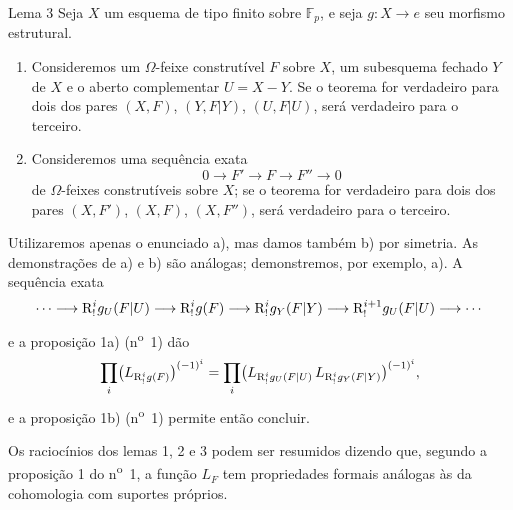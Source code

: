 \begin{statement}{Lema 3}
Seja $X$ um esquema de tipo finito sobre $\mathbb F_p$, e seja $g:X\to e$ seu morfismo estrutural.
\begin{enumerate}[label=\alph*)]
\item Consideremos um $\Omega$-feixe construtível $F$ sobre $X$, um subesquema fechado $Y$ de $X$ e o aberto complementar $U=X-Y$. Se o teorema for verdadeiro para dois dos pares $(X,F)$, $(Y,F|Y)$, $(U,F|U)$, será verdadeiro para o terceiro.
\item Consideremos uma sequência exata
\[
0\longrightarrow F'\longrightarrow F\longrightarrow F''\longrightarrow0
\]
de $\Omega$-feixes construtíveis sobre $X$; se o teorema for verdadeiro para dois dos pares $(X,F')$, $(X,F)$, $(X,F'')$, será verdadeiro para o terceiro.
\end{enumerate}
\end{statement}

Utilizaremos apenas o enunciado a), mas damos também b) por simetria. As demonstrações de a) e b) são análogas; demonstremos, por exemplo, a). A sequência exata
\[
\cdots\longrightarrow \mathrm{R}^i_!g_U(F|U)\longrightarrow \mathrm{R}^i_!g(F)
\longrightarrow \mathrm{R}^i_!g_Y(F|Y)\longrightarrow \mathrm{R}^{i+1}_!g_U(F|U)\longrightarrow\cdots
\]
e a proposição 1a) (n\textsuperscript{o}~1) dão
\[
\prod_i\bigl(L_{\mathrm{R}^i_!g(F)}\bigr)^{(-1)^i}
=\prod_i\bigl(L_{\mathrm{R}^i_!g_U(F|U)}\,L_{\mathrm{R}^i_!g_Y(F|Y)}\bigr)^{(-1)^i},
\]
e a proposição 1b) (n\textsuperscript{o}~1) permite então concluir.

Os raciocínios dos lemas 1, 2 e 3 podem ser resumidos dizendo que, segundo a proposição 1 do n\textsuperscript{o}~1, a função $L_F$ tem propriedades formais análogas às da cohomologia com suportes próprios.
